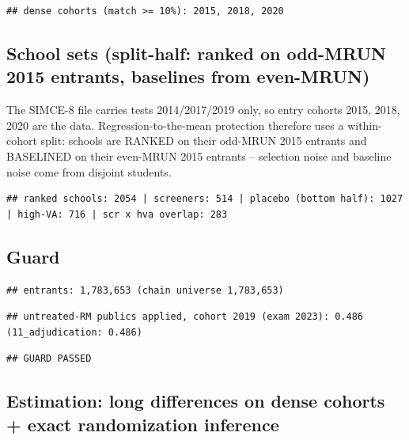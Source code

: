 \documentclass[
]{article}
\begin{document}
\begin{verbatim}
## dense cohorts (match >= 10%): 2015, 2018, 2020
\end{verbatim}

\hypertarget{school-sets-split-half-ranked-on-odd-mrun-2015-entrants-baselines-from-even-mrun}{%
\subsection{School sets (split-half: ranked on odd-MRUN 2015 entrants,
baselines from
even-MRUN)}\label{school-sets-split-half-ranked-on-odd-mrun-2015-entrants-baselines-from-even-mrun}}

The SIMCE-8 file carries tests 2014/2017/2019 only, so entry cohorts
2015, 2018, 2020 are the data. Regression-to-the-mean protection
therefore uses a within-cohort split: schools are RANKED on their
odd-MRUN 2015 entrants and BASELINED on their even-MRUN 2015 entrants --
selection noise and baseline noise come from disjoint students.

\begin{verbatim}
## ranked schools: 2054 | screeners: 514 | placebo (bottom half): 1027 | high-VA: 716 | scr x hva overlap: 283
\end{verbatim}

\hypertarget{guard}{%
\subsection{Guard}\label{guard}}

\begin{verbatim}
## entrants: 1,783,653 (chain universe 1,783,653)
\end{verbatim}

\begin{verbatim}
## untreated-RM publics applied, cohort 2019 (exam 2023): 0.486 (11_adjudication: 0.486)
\end{verbatim}

\begin{verbatim}
## GUARD PASSED
\end{verbatim}

\hypertarget{estimation-long-differences-on-dense-cohorts-exact-randomization-inference}{%
\subsection{Estimation: long differences on dense cohorts + exact
randomization
inference}\label{estimation-long-differences-on-dense-cohorts-exact-randomization-inference}}
\end{document}

